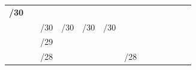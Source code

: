 \documentclass[11pt,a4paper]{report}
\begin{document}
\begin{center}
\begin{longtable}{rlcccccccccccccccc}
                \textbf{/30}                                                                                             &                       & \cellcolor[HTML]{C09FE5}  & \cellcolor[HTML]{C09FE5}  &                           &                           &                           &                            &                            &                            &                                 &                                 &                                 &                                 &                                 &                                 &                                  &                                 \\ \cline{1-1} \cline{3-18} 
                                                                                                                         & \multicolumn{1}{l|}{} & \multicolumn{2}{l}{\cellcolor[HTML]{C09FE5}/30}       & \multicolumn{2}{c}{\cellcolor[HTML]{C09FE5}/30}       & \multicolumn{2}{c}{\cellcolor[HTML]{C09FE5}/30}        & \multicolumn{2}{c}{\cellcolor[HTML]{C09FE5}/30}         & \multicolumn{2}{c}{\cellcolor[HTML]{BFBFBF}}                      & \multicolumn{2}{c}{\cellcolor[HTML]{FFD966}}                      & \multicolumn{2}{c}{\cellcolor[HTML]{A9D08E}}                      & \multicolumn{2}{c|}{\cellcolor[HTML]{F4B084}}                      \\
                                                                                                                         & \multicolumn{1}{l|}{} & \multicolumn{4}{l}{/29}                                                                                       & \multicolumn{4}{c}{}                                                                                             & \multicolumn{2}{c}{\cellcolor[HTML]{BFBFBF}}                      & \multicolumn{2}{c}{\cellcolor[HTML]{FFD966}}                      & \multicolumn{2}{c}{\cellcolor[HTML]{A9D08E}}                      & \multicolumn{2}{c|}{\cellcolor[HTML]{F4B084}}                      \\
                                                                                                                         & \multicolumn{1}{l|}{} & \multicolumn{8}{l}{\cellcolor[HTML]{BFBFBF}/28}                                                                                                                                                                                  & \multicolumn{2}{c}{\multirow{-3}{*}{\cellcolor[HTML]{BFBFBF}/28}} & \multicolumn{2}{c}{\cellcolor[HTML]{FFD966}}                      & \multicolumn{2}{c}{\cellcolor[HTML]{A9D08E}}                      & \multicolumn{2}{c|}{\cellcolor[HTML]{F4B084}}                      \\

\end{longtable}
\end{center}
\end{document}
